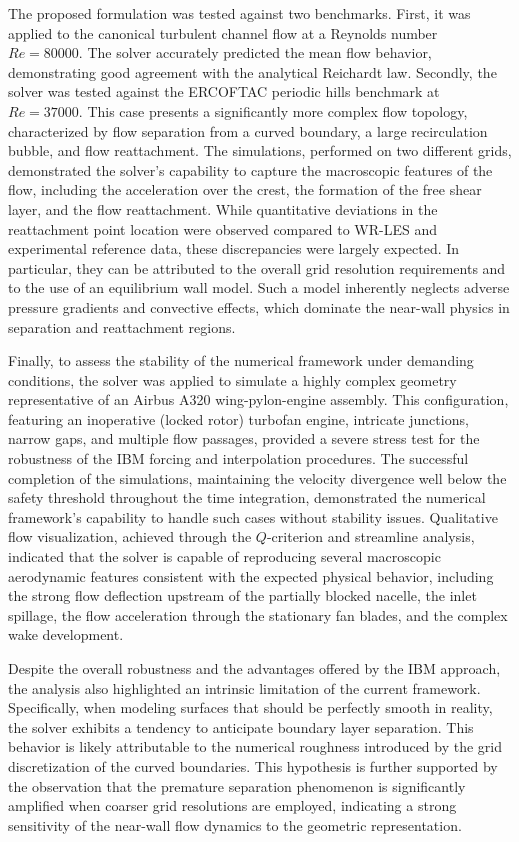 \documentclass[12pt, a4paper, twoside, openright]{book}
\begin{document}
The proposed formulation was tested against two benchmarks. First, it was applied to the canonical turbulent channel flow at a Reynolds number $Re = 80000$. The solver accurately predicted the mean flow behavior, demonstrating good agreement with the analytical Reichardt law. Secondly, the solver was tested against the ERCOFTAC periodic hills benchmark at $Re = 37000$. This case presents a significantly more complex flow topology, characterized by flow separation from a curved boundary, a large recirculation bubble, and flow reattachment. The simulations, performed on two different grids, demonstrated the solver's capability to capture the macroscopic features of the flow, including the acceleration over the crest, the formation of the free shear layer, and the flow reattachment. While quantitative deviations in the reattachment point location were observed compared to WR-LES and experimental reference data, these discrepancies were largely expected. In particular, they can be attributed to the overall grid resolution requirements and to the use of an equilibrium wall model. Such a model inherently neglects adverse pressure gradients and convective effects, which dominate the near-wall physics in separation and reattachment regions.

Finally, to assess the stability of the numerical framework under demanding conditions, the solver was applied to simulate a highly complex geometry representative of an Airbus A320 wing-pylon-engine assembly. This configuration, featuring an inoperative (locked rotor) turbofan engine, intricate junctions, narrow gaps, and multiple flow passages, provided a severe stress test for the robustness of the IBM forcing and interpolation procedures. The successful completion of the simulations, maintaining the velocity divergence well below the safety threshold throughout the time integration, demonstrated the numerical framework's capability to handle such cases without stability issues. Qualitative flow visualization, achieved through the $Q$-criterion and streamline analysis, indicated that the solver is capable of reproducing several macroscopic aerodynamic features consistent with the expected physical behavior, including the strong flow deflection upstream of the partially blocked nacelle, the inlet spillage, the flow acceleration through the stationary fan blades, and the complex wake development.

Despite the overall robustness and the advantages offered by the IBM approach, the analysis also highlighted an intrinsic limitation of the current framework. Specifically, when modeling surfaces that should be perfectly smooth in reality, the solver exhibits a tendency to anticipate boundary layer separation. This behavior is likely attributable to the numerical roughness introduced by the grid discretization of the curved boundaries. This hypothesis is further supported by the observation that the premature separation phenomenon is significantly amplified when coarser grid resolutions are employed, indicating a strong sensitivity of the near-wall flow dynamics to the geometric representation.
\end{document}
